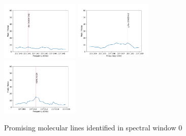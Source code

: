\documentclass[10pt]{article}
\begin{document}
\begin{figure}
    \includegraphics[width=0.33\textwidth]{spw0_cis-CH2OHCHO}
    \includegraphics[width=0.33\textwidth]{spw0_g'Ga-(CH2OH)2}
    \includegraphics[width=0.33\textwidth]{spw0_H2NCH2CN}
    \caption{Promising molecular lines identified in spectral window 0}
   \end{figure}
   
\end{document}
